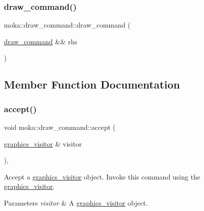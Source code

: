 \mbox{\label{classmoka_1_1draw__command_ad52678c738121e05bfa122b4736f4f24}} 
\subsubsection{\texorpdfstring{draw\_command()}{draw\_command()}\hspace{0.1cm}{\footnotesize\ttfamily [3/3]}}
{\footnotesize\ttfamily moka\+::draw\+\_\+command\+::draw\+\_\+command (\begin{DoxyParamCaption}\item[{\mbox{\hyperlink{classmoka_1_1draw__command}{draw\+\_\+command}} \&\&}]{rhs }\end{DoxyParamCaption})\hspace{0.3cm}{\ttfamily [noexcept]}}



\subsection{Member Function Documentation}
\mbox{\label{classmoka_1_1draw__command_a5182c69d730f0a34185e190b4e1ecf54}} 
\subsubsection{\texorpdfstring{accept()}{accept()}}
{\footnotesize\ttfamily void moka\+::draw\+\_\+command\+::accept (\begin{DoxyParamCaption}\item[{\mbox{\hyperlink{classmoka_1_1graphics__visitor}{graphics\+\_\+visitor}} \&}]{visitor }\end{DoxyParamCaption})\hspace{0.3cm}{\ttfamily [override]}, {\ttfamily [virtual]}}



Accept a \mbox{\hyperlink{classmoka_1_1graphics__visitor}{graphics\+\_\+visitor}} object. Invoke this command using the \mbox{\hyperlink{classmoka_1_1graphics__visitor}{graphics\+\_\+visitor}}. 


\begin{DoxyParams}{Parameters}
{\em visitor} & A \mbox{\hyperlink{classmoka_1_1graphics__visitor}{graphics\+\_\+visitor}} object. \\
\hline
\end{DoxyParams}



